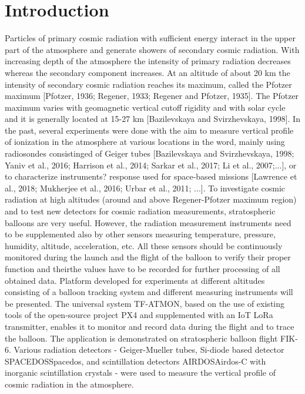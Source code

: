 \documentclass{Rpd}
\begin{document}
\maketitle


\section{Introduction}

Particles of primary cosmic radiation with sufficient energy interact in the upper part of the atmosphere and generate showers of secondary cosmic radiation. With increasing depth of the atmosphere the intensity of primary radiation decreases whereas the secondary component increases. At an altitude of about 20 km the intensity of secondary cosmic radiation reaches its maximum, called the Pfotzer maximum [Pfotzer, 1936; Regener, 1933; Regener and Pfotzer, 1935]. The Pfotzer maximum varies with geomagnetic vertical cutoff rigidity and with solar cycle and it is generally located at 15-27 km [Bazilevskaya and Svirzhevskaya, 1998].
In the past, several experiments were done with the aim to measure vertical profile of ionization in the atmosphere at various locations in the word, mainly using radiosondes consistinged of Geiger tubes [Bazilevskaya and Svirzhevskaya, 1998; Yaniv et al., 2016; Harrison et al., 2014; Sarkar et al., 2017; Li et al., 2007;...], or to characterize instruments? response used for space-based missions [Lawrence et al., 2018; Mukherjee et al., 2016; Urbar et al., 2011; ...].
To investigate cosmic radiation at high altitudes (around and above Regener-Pfotzer maximum region) and to test new detectors for cosmic radiation measurements, stratospheric balloons are very useful.
However, the radiation measurement instruments need to be supplemented also by other sensors measuring temperature, pressure, humidity, altitude, acceleration, etc.  All these sensors should be continuously monitored during the launch and the flight of the balloon to verify their proper function and theirthe values have to be recorded for further processing of all obtained data.
Platform developed for experiments at different altitudes consisting of a balloon tracking system and different measuring instruments will be presented. The universal system TF-ATMON, based on the use of existing tools of the open-source project PX4 and supplemented with an IoT LoRa transmitter, enables it to monitor and record data during the flight and to trace the balloon. The application is demonstrated on stratospheric balloon flight FIK-6. Various radiation detectors - Geiger-Mueller tubes, Si-diode based detector SPACEDOSSpacedos, and scintillation detectors AIRDOSAirdos-C with inorganic scintillation crystals - were used to measure the vertical profile of cosmic radiation in the atmosphere.
\end{document}
